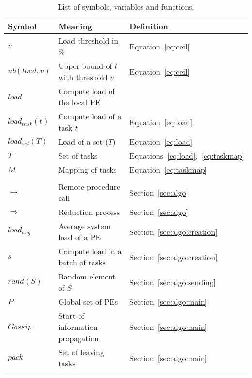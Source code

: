 
\begin{table}[t]
	\centering
	\caption{List of symbols, variables and functions.}
	\begin{tabular}{l l l}
		\toprule
		\textbf{Symbol} & \textbf{Meaning} & \textbf{Definition}\\ 
		\midrule	
		$v$				& Load threshold in \% 								& Equation~\ref{eq:ceil} \\
		$ub(load,v)$		& Upper bound of $l$ with threshold $v$		 		& Equation~\ref{eq:ceil} \\
		$load$			& Compute load of the local PE \\
		$load_{task}(t)$	& Compute load of a task $t$							& Equation~\ref{eq:load}	\\
		$load_{set}(T)$	& Load of a set ($T$) 								& Equation~\ref{eq:load} \\
		$T$				& Set of tasks 										& Equations~\ref{eq:load},~\ref{eq:taskmap} \\		
		$M$				& Mapping of tasks									& Equation~\ref{eq:taskmap} \\
		& &\\	

		$\rightarrow$ 	& Remote procedure call 								& Section~\ref{sec:algo} \\
		$\Rightarrow$ 	& Reduction process 									& Section~\ref{sec:algo} \\
		$load_{avg}$		& Average system load of a PE 						& Section~\ref{sec:algo:creation}\\ 
		$s$			  	& Compute load in a batch of tasks 					& Section~\ref{sec:algo:creation} \\
		$rand(S)$		& Random element of $S$ 								& Section~\ref{sec:algo:sending} \\
		$P$				& Global set of PEs 									& Section~\ref{sec:algo:main} \\
		$Gossip$			& Start of information propagation					& Section~\ref{sec:algo:main} \\		
		$pack$			& Set of leaving tasks								& Section~\ref{sec:algo:main} \\
		& &\\
				

\end{tabular}
\end{table}

